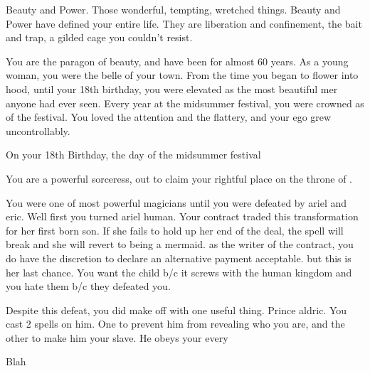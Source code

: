 \documentclass[char]{NeptuneBall}
\begin{document}
\name{\cWitch{}}



Beauty and Power. Those wonderful, tempting, wretched things. Beauty and Power have defined your entire life. They are liberation and confinement, the bait and trap, a gilded cage you couldn't resist.

You are the paragon of beauty, and have been for almost 60 years. As a young woman, you were the belle of your town. From the time you began to flower into \cWitch{\human}hood, until your 18th birthday, you were elevated as the most beautiful mer\cWitch{\mer} anyone had ever seen. Every year at the midsummer festival, you were crowned as \cWitch{\King} of the festival. You loved the attention and the flattery, and your ego grew uncontrollably.

On your 18th Birthday, the day of the midsummer festival

You are a powerful sorceress, out to claim your rightful place on the throne of \pAtlantis{}. 

You were one of \pAtlantis{} most powerful magicians until you were defeated by ariel and eric.  Well first you turned ariel human. Your contract traded this transformation for her first born son. If she fails to hold up her end of the deal, the spell will break and she will revert to being a mermaid. as the writer of the contract, you do have the discretion to declare an alternative payment acceptable. but this is her last chance. You want the child b/c it screws with the human kingdom and you hate them b/c they defeated you.

Despite this defeat, you did make off with one useful thing. Prince aldric. You cast 2 spells on him. One to prevent him from revealing who you are, and the other to make him your slave. He obeys your every


\begin{itemz}[Goals]
  \item Blah
\end{itemz}

\begin{contacts}
  \contact{}
\end{contacts}
\end{document}
